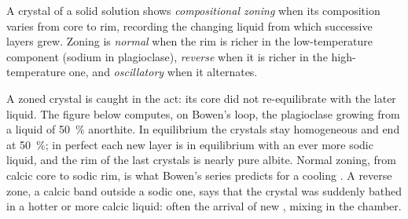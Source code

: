 \begin{definition}\label{def:b2:magmatic-differentiation:zoning}
A crystal of a solid solution shows \emph{compositional zoning} when its composition varies from core to rim, recording the changing liquid
from which successive layers grew. Zoning is \emph{normal} when the rim is richer in
the low-temperature component (sodium in plagioclase), \emph{reverse} when it is
richer in the high-temperature one, and \emph{oscillatory} when it alternates.
\end{definition}

A zoned crystal is  caught in the act: its core did not
re-equilibrate with the later liquid. The figure below computes, on Bowen's loop,
the plagioclase growing from a liquid of \qty{50}{\percent} anorthite. In
equilibrium the crystals stay homogeneous and end at \qty{50}{\percent}; in perfect
 each new layer is in equilibrium with an ever more sodic
liquid, and the rim of the last crystals is nearly pure albite. Normal zoning, from
calcic core to sodic rim, is what Bowen's series predicts for a cooling . A reverse
zone, a calcic band outside a sodic one, says that the crystal was suddenly bathed in
a hotter or more calcic liquid: often the arrival of new , mixing in the
chamber.

